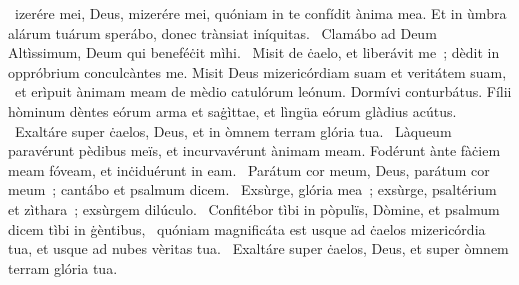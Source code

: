 \psalmChapterWithInscription{}
{ }
{%
~izerére mei, Deus, mizerére mei, quóniam in te confídit ànima mea. Et in ùmbra alárum tuárum sperábo, donec trànsiat iníquitas. 
~Clamábo ad Deum Altìssimum, Deum qui beneféċit mìhi. 
~Misit de ċaelo, et liberávit me~; dèdit in oppróbrium conculcàntes me. Misit Deus mizericórdiam suam et veritátem suam, 
~et erìpuit ànimam meam de mèdio catulórum leónum. Dormívi conturbátus. Fílii hòminum dèntes eórum arma et saġìttae, et lìngüa eórum glàdius acútus. 
~Exaltáre super ċaelos, Deus, et in òmnem terram glória tua. 
~Làqueum paravérunt pèdibus meïs, et incurvavérunt ànimam meam. Fodérunt ànte fàċiem meam fóveam, et inċiduérunt in eam. 
~Parátum cor meum, Deus, parátum cor meum~; cantábo et psalmum dicem. 
~Exsùrge, glória mea~; exsùrge, psaltérium et zìthara~; exsùrgem dilúculo. 
~Confitébor tìbi in pòpulïs, Dòmine, et psalmum dicem tìbi in ġèntibus, 
~quóniam magnificáta est usque ad ċaelos mizericórdia tua, et usque ad nubes vèritas tua. 
~Exaltáre super ċaelos, Deus, et super òmnem terram glória tua. 
}
